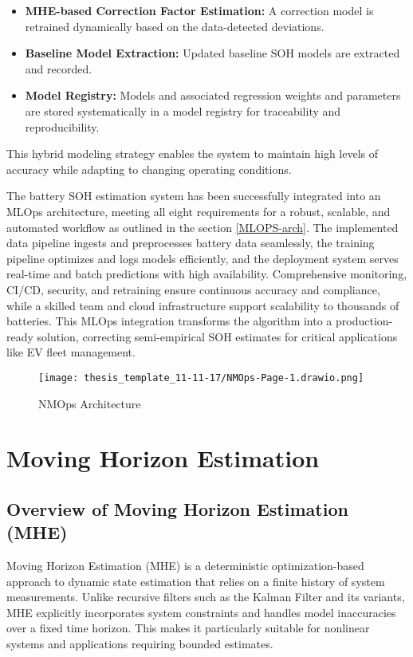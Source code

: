 \begin{itemize}
\begin{itemize}
        \item \textbf{MHE-based Correction Factor Estimation:} A correction model is retrained dynamically based on the data-detected deviations.
        \item \textbf{Baseline Model Extraction:} Updated baseline SOH models are extracted and recorded.
        \item \textbf{Model Registry:} Models and associated regression weights and parameters are stored systematically in a model registry for traceability and reproducibility.
    \end{itemize}
    This hybrid modeling strategy enables the system to maintain high levels of accuracy while adapting to changing operating conditions.
\end{itemize}

The battery SOH estimation system has been successfully integrated into an MLOps architecture, meeting all eight requirements for a robust, scalable, and automated workflow as outlined in the section \ref{MLOPS-arch}. The implemented data pipeline ingests and preprocesses battery data seamlessly, the training pipeline optimizes and logs models efficiently, and the deployment system serves real-time and batch predictions with high availability. Comprehensive monitoring, CI/CD, security, and retraining ensure continuous accuracy and compliance, while a skilled team and cloud infrastructure support scalability to thousands of batteries. This MLOps integration transforms the algorithm into a production-ready solution, correcting semi-empirical SOH estimates for critical applications like EV fleet management.
\begin{figure}
    \centering
    \texttt{[image: thesis\_template\_11-11-17/NMOps-Page-1.drawio.png]}
    \caption{NMOps Architecture}
    \label{fig:nmops-architecture}
\end{figure}

\section{Moving Horizon Estimation}
\label{MHE}

\subsection{Overview of Moving Horizon Estimation (MHE)}

Moving Horizon Estimation (MHE) is a deterministic optimization-based approach to dynamic state estimation that relies on a finite history of system measurements. Unlike recursive filters such as the Kalman Filter and its variants, MHE explicitly incorporates system constraints and handles model inaccuracies over a fixed time horizon. This makes it particularly suitable for nonlinear systems and applications requiring bounded estimates.

